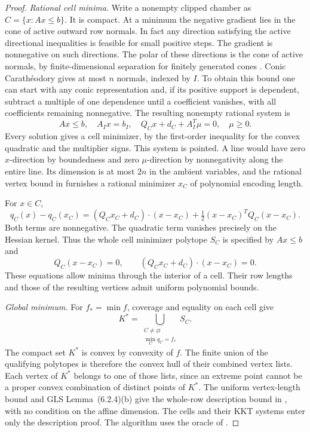 \begin{proof}
\emph{Rational cell minima.}
Write a nonempty clipped chamber as $C=\{x:Ax\leq b\}$. It is compact. At a minimum the negative gradient lies in the cone of active outward row normals. In fact any direction satisfying the active directional inequalities is feasible for small positive steps. The gradient is nonnegative on such directions. The polar of these directions is the cone of active normals, by finite-dimensional separation for finitely generated cones \cite[Sections~19 and~22]{rockafellar1970}. Conic Carath\'eodory gives at most $n$ normals, indexed by $I$. To obtain this bound one can start with any conic representation and, if its positive support is dependent, subtract a multiple of one dependence until a coefficient vanishes, with all coefficients remaining nonnegative. The resulting nonempty rational system is
\begin{equation}\label{eq:kkt}
 Ax\leq b,\quad A_Ix=b_I,\quad
 Q_Cx+d_C+A_I^T\mu=0,\quad \mu\geq0 .
\end{equation}
Every solution gives a cell minimizer, by the first-order inequality for the convex quadratic and the multiplier signs. This system is pointed. A line would have zero $x$-direction by boundedness and zero $\mu$-direction by nonnegativity along the entire line. Its dimension is at most $2n$ in the ambient variables, and the rational vertex bound in  furnishes a rational minimizer $x_C$ of polynomial encoding length.

For $x\in C$,
\[
 q_C(x)-q_C(x_C)
 = (Q_Cx_C+d_C)\cdot(x-x_C)+\tfrac12(x-x_C)^TQ_C(x-x_C).
\]
Both terms are nonnegative. The quadratic term vanishes precisely on the Hessian kernel. Thus the whole cell minimizer polytope $S_C$ is specified by $Ax\leq b$ and
\begin{equation}\label{eq:cell-min}
 Q_C(x-x_C)=0,\qquad (Q_Cx_C+d_C)\cdot(x-x_C)=0 .
\end{equation}
These equations allow minima through the interior of a cell. Their row lengths and those of the resulting vertices admit uniform polynomial bounds.

\emph{Global minimum.}
For $f_*=\min f$, coverage and equality on each cell give
\[
 K^*=\bigcup_{\substack{C\ne\varnothing\\ \min_C q_C=f_*}} S_C .
\]
The compact set $K^*$ is convex by convexity of $f$. The finite union of the qualifying polytopes is therefore the convex hull of their combined vertex lists. Each vertex of $K^*$ belongs to one of those lists, since an extreme point cannot be a proper convex combination of distinct points of $K^*$. The uniform vertex-length bound and GLS Lemma~(6.2.4)(b) give the whole-row description bound in , with no condition on the affine dimension. The cells and their KKT systems enter only the description proof. The algorithm uses the oracle of .
\end{proof}
